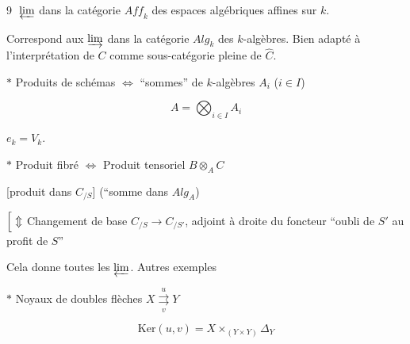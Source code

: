 

\textcircled{9} $\varprojlim$ dans la catégorie $\mathit{Aff}_k$ des espaces algébriques affines sur $k$.

Correspond aux $\varinjlim$ dans la catégorie $\mathit{Alg}_k$ des $k$-algèbres. Bien adapté à l'interprétation de $C$ comme sous-catégorie pleine de $\widehat C$.

$*$ Produits de schémas $\Longleftrightarrow$ ``sommes'' de $k$-algèbres $A_i$ ($i\in I$)

\[
A=\bigotimes_{i\in I}A_i
\]

  \quad $e_k=V_k$.


$*$ Produit fibré $\Longleftrightarrow$ Produit tensoriel $B\otimes_A C$

[produit dans $C_{/S}$] \qquad (``somme dans $\mathit{Alg}_A$)

$\Bigl[\ \Updownarrow$ Changement de base $C_{/S}\to C_{/S'}$, adjoint à droite du foncteur ``oubli de $S'$ au profit de $S$''




Cela donne toutes les $\varprojlim$. Autres exemples

$*$ Noyaux de doubles flèches \quad $X\overset{u}{\underset{v}{\rightrightarrows}}Y$

\[
\mathrm{Ker}(u,v)=X\times_{(Y\times Y)}\Delta_Y
\]


